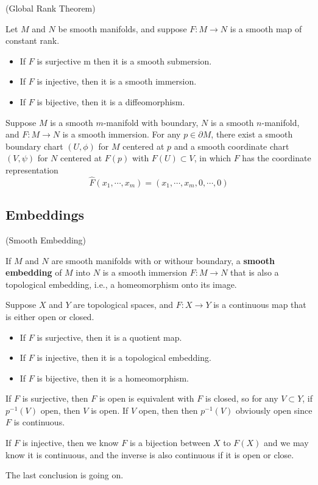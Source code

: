 \begin{theorem}(Global Rank Theorem)\par
    Let $M$ and $N$ be smooth manifolds, and suppose $F:M\to N$ is a smooth map of constant rank.
    \begin{itemize}
        \item If $F$ is surjective m then it is a smooth submersion.
        \item If $F$ is injective, then it is a smooth immersion.
        \item If $F$ is bijective, then it is a diffeomorphism.
    \end{itemize}
\end{theorem}

\begin{theorem}
    Suppose $M$ is a smooth $m$-manifold with boundary, $N$ is a smooth $n$-manifold, and $F:M\to N$ is a smooth immersion. For any $p\in\partial M$, there exist a smooth boundary chart $(U,\phi)$ for $M$ centered at $p$ and a smooth coordinate chart $(V,\psi)$ for $N$ centered at $F(p)$ with $F(U)\subset V$, in which $F$ has the coordinate representation
    \[
    \hat{F}(x_1,\cdots,x_m) = (x_1,\cdots,x_m,0,\cdots,0)
    \]    
\end{theorem}

\subsection{Embeddings}

\begin{definition}(Smooth Embedding)\par
    If $M$ and $N$ are smooth manifolds with or withour boundary, a \textbf{smooth embedding} of $M$ into $N$ is a smooth immersion $F:M\to N$ that is also a topological embedding, i.e., a homeomorphism onto its image.
\end{definition}

\begin{lemma}
    Suppose $X$ and $Y$ are topological spaces, and $F:X\to Y$ is a continuous map that is either open or closed.
    \begin{itemize}
        \item If $F$ is surjective, then it is a quotient map.
        \item If $F$ is injective, then it is a topological embedding.
        \item If $F$ is bijective, then it is a homeomorphism.
    \end{itemize}
\end{lemma}
\Pf\par
    If $F$ is surjective, then $F$ is open is equivalent with $F$ is closed, so for any $V\subset Y$, if $p^{-1}(V)$ open, then $V$ is open. If $V$ open, then then $p^{-1}(V)$ obviously open since $F$ is continuous.\par
    If $F$ is injective, then we know $F$ is a bijection between $X$ to $F(X)$ and we may know it is continuous, and the inverse is also continuous if it is open or close.\par
    The last conclusion is going on. 

